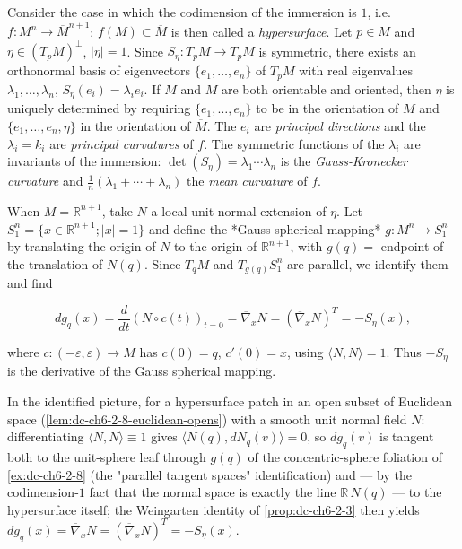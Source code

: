 \begin{example}
  \label{ex:dc-ch6-2-4}
  \leanok
  Consider the case in which the codimension of the immersion is $1$, i.e.
  $f:M^n\to\overline{M}^{n+1}$; $f(M)\subset\overline{M}$ is then called a
  \emph{hypersurface}. Let $p\in M$ and $\eta\in(T_pM)^\perp$, $|\eta|=1$. Since
  $S_\eta:T_pM\to T_pM$ is symmetric, there exists an orthonormal basis of
  eigenvectors $\{e_1,\dots,e_n\}$ of $T_pM$ with real eigenvalues
  $\lambda_1,\dots,\lambda_n$, $S_\eta(e_i)=\lambda_i e_i$. If $M$ and $\overline{M}$
  are both orientable and oriented, then $\eta$ is uniquely determined by requiring
  $\{e_1,\dots,e_n\}$ to be in the orientation of $M$ and $\{e_1,\dots,e_n,\eta\}$ in
  the orientation of $\overline{M}$. The $e_i$ are \emph{principal directions} and the
  $\lambda_i=k_i$ are \emph{principal curvatures} of $f$. The symmetric functions of the
  $\lambda_i$ are invariants of the immersion: $\det(S_\eta)=\lambda_1\cdots\lambda_n$
  is the \emph{Gauss-Kronecker curvature} and
  $\frac{1}{n}(\lambda_1+\cdots+\lambda_n)$ the \emph{mean curvature} of $f$.
  
  When $\overline{M}=\mathbb{R}^{n+1}$, take $N$ a local unit normal extension of
  $\eta$. Let $S_1^n=\{x\in\mathbb{R}^{n+1};|x|=1\}$ and define the *Gauss spherical
  mapping* $g:M^n\to S_1^n$ by translating the origin of $N$ to the origin of
  $\mathbb{R}^{n+1}$, with $g(q)=$ endpoint of the translation of $N(q)$. Since
  $T_qM$ and $T_{g(q)}S_1^n$ are parallel, we identify them and find
  
  $$
  dg_q(x)=\frac{d}{dt}(N\circ c(t))_{t=0}=\overline{\nabla}_x N=(\overline{\nabla}_x N)^T=-S_\eta(x),
  $$
  
  where $c:(-\varepsilon,\varepsilon)\to M$ has $c(0)=q$, $c'(0)=x$, using
  $\langle N,N\rangle=1$. Thus $-S_\eta$ is the derivative of the Gauss spherical
  mapping.

  In the identified picture, for a hypersurface patch in an open subset of
  Euclidean space (\cref{lem:dc-ch6-2-8-euclidean-opens}) with a smooth unit
  normal field $N$: differentiating $\langle N,N\rangle\equiv1$ gives
  $\langle N(q),dN_q(v)\rangle=0$, so $dg_q(v)$ is tangent both to the
  unit-sphere leaf through $g(q)$ of the concentric-sphere foliation of
  \cref{ex:dc-ch6-2-8} (the "parallel tangent spaces" identification) and — by
  the codimension-$1$ fact that the normal space is exactly the line
  $\mathbb{R}\,N(q)$ — to the hypersurface itself; the Weingarten identity of
  \cref{prop:dc-ch6-2-3} then yields $dg_q(x)=\overline\nabla_xN
  =(\overline\nabla_xN)^T=-S_\eta(x)$.
\end{example}

